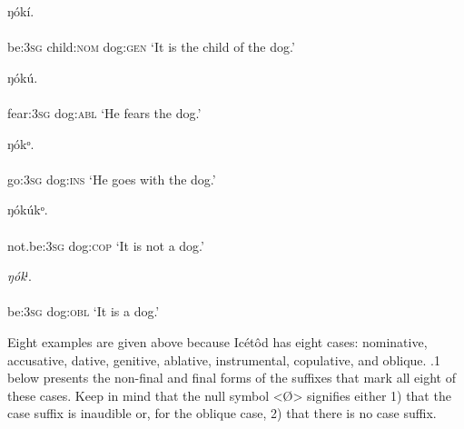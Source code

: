 \ea\label{ex:}
     ŋókí. \\
    \\
be:\textsc{3sg}   child:\textsc{nom}   dog:\textsc{gen}
\glt ‘It is the child of the dog.’ 
\z




\ea\label{ex:}
     ŋókú. \\
    \\
fear:\textsc{3sg}   dog:\textsc{abl}
\glt ‘He fears the dog.’ 
\z




\ea\label{ex:}
     ŋókᵒ. \\
    \\
go:\textsc{3sg}  dog:\textsc{ins}
\glt ‘He goes with the dog.’ 
\z




\ea\label{ex:}
     ŋókúkᵒ. \\
    \\
not.be:\textsc{3sg}  dog:\textsc{cop}
\glt ‘It is not a dog.’ 
\z




\ea\label{ex:}
     \textit{ŋók}ⁱ. \\
    \\
be:\textsc{3sg}  dog:\textsc{obl}
\glt ‘It is a dog.’ 
\z


Eight examples are given above because Icétôd has eight cases: nominative, accusative, dative, genitive, ablative, instrumental, copulative, and oblique. .1 below presents the non-final and final forms of the suffixes that mark all eight of these cases. Keep in mind that the null symbol <Ø> signifies either 1) that the case suffix is inaudible or, for the oblique case, 2) that there is no case suffix. 


